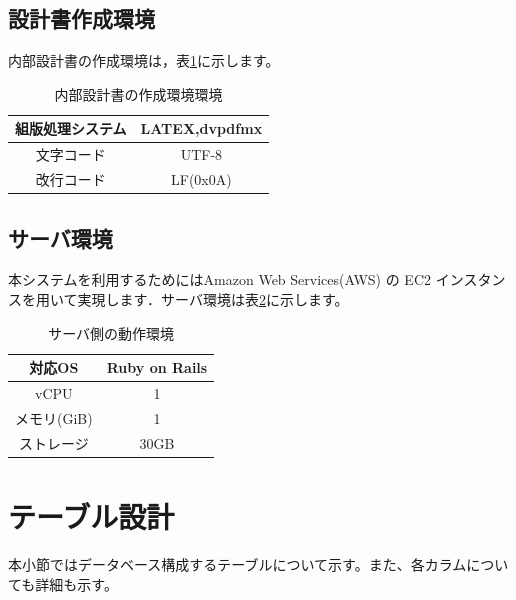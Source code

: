 \documentclass[a4j]{jarticle}
\begin{document}
\subsection{設計書作成環境}
内部設計書の作成環境は，表\ref{tab:creating_environment}に示します。
\begin{table}[htb]
\caption{内部設計書の作成環境環境}
\begin{center}
  \begin{tabular}{|c|c|} \hline
    組版処理システム & LATEX,dvpdfmx\\ \hline
   文字コード &  UTF-8\\ \hline
    改行コード & LF(0x0A)  \\ \hline
  \end{tabular}
\label{tab:creating_environment}
\end{center}
\end{table}
\subsection{サーバ環境}
本システムを利用するためにはAmazon Web Services(AWS) の EC2 インスタンスを用いて実現します．サーバ環境は表\ref{tab:server_environment}に示します。
\begin{table}[htb]
\caption{サーバ側の動作環境}
\begin{center}
  \begin{tabular}{|c|c|} \hline
    対応OS & Ruby on Rails \\ \hline
   vCPU & 1\\ \hline
    メモリ(GiB) & 1  \\ \hline
    ストレージ & 30GB \\ \hline
  \end{tabular}
\label{tab:server_environment}
\end{center}
\end{table}
 \section{テーブル設計}
本小節ではデータベース構成するテーブルについて示す。また、各カラムについても詳細も示す。
\end{document}
